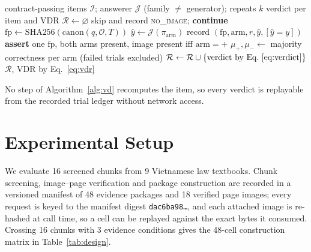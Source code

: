 \documentclass[conference]{IEEEtran}
\newcommand{\vdrate}{\mathrm{VDR}}
\begin{document}
\begin{algorithm}[t]
\caption{Visual-dependence ablation (defines $\vdrate$)}
\label{alg:vd}
\begin{algorithmic}[1]
\Require contract-passing items $\mathcal{I}$; answerer $\mathcal{J}$ (family $\neq$ generator); repeats $k$
\Ensure verdict per item and $\vdrate$
\State $\mathcal{R}\gets\varnothing$
   \State skip and record \textsc{no\_image}; \textbf{continue} \EndIf
  \State $\mathrm{fp}\gets\mathrm{SHA256}(\mathrm{canon}(q,\mathcal{O},T))$
    \State $\hat{y}\gets\mathcal{J}(\pi_{\mathrm{arm}})$ 
    \State record $(\mathrm{fp},\mathrm{arm},r,\hat{y},[\hat{y}=y])$
  \EndFor
  \State \textbf{assert} one $\mathrm{fp}$, both arms present, image present iff $\mathrm{arm}=+$
  \State $\mu_{+},\mu_{-}\gets$ majority correctness per arm (failed trials excluded)
  \State $\mathcal{R}\gets\mathcal{R}\cup\{\text{verdict by Eq.~\eqref{eq:verdict}}\}$
\EndFor
\State \Return $\mathcal{R}$, $\vdrate$ by Eq.~\eqref{eq:vdr}
\end{algorithmic}
\end{algorithm}

No step of Algorithm~\ref{alg:vd} recomputes the item, so every verdict is
replayable from the recorded trial ledger without network access.

\section{Experimental Setup}
\label{sec:setup}
We evaluate 16 screened chunks from 9 Vietnamese law textbooks. Chunk screening,
image--page verification and package construction are recorded in a versioned
manifest of 48 evidence packages and 18 verified page images; every request is
keyed to the manifest digest \texttt{dac6ba98\ldots}, and each attached image is
re-hashed at call time, so a cell can be replayed against the exact bytes it
consumed. Crossing 16 chunks with 3 evidence conditions gives the 48-cell
construction matrix in Table~\ref{tab:design}.
\end{document}
